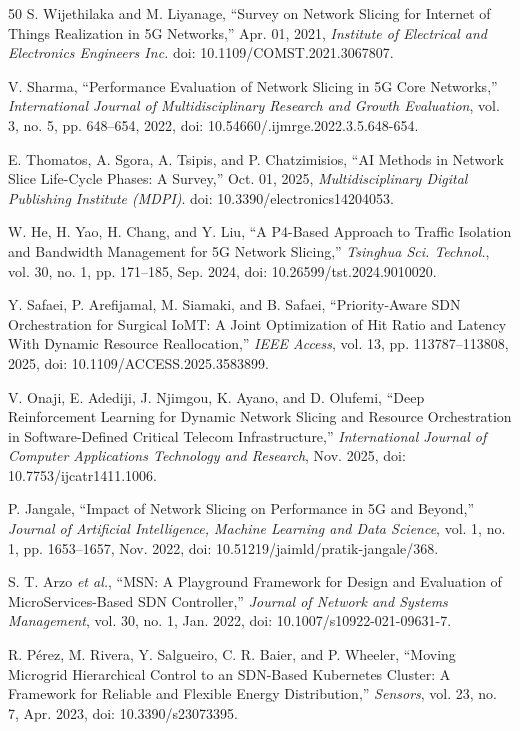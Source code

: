 \documentclass[conference]{IEEEtran}
\begin{document}
\begin{thebibliography}{50}
 S. Wijethilaka and M. Liyanage, ``Survey on Network Slicing for Internet of Things Realization in 5G Networks,'' Apr. 01, 2021, \emph{Institute of Electrical and Electronics Engineers Inc.} doi: 10.1109/COMST.2021.3067807.

 V. Sharma, ``Performance Evaluation of Network Slicing in 5G Core Networks,'' \emph{International Journal of Multidisciplinary Research and Growth Evaluation}, vol. 3, no. 5, pp. 648--654, 2022, doi: 10.54660/.ijmrge.2022.3.5.648-654.

 E. Thomatos, A. Sgora, A. Tsipis, and P. Chatzimisios, ``AI Methods in Network Slice Life-Cycle Phases: A Survey,'' Oct. 01, 2025, \emph{Multidisciplinary Digital Publishing Institute (MDPI)}. doi: 10.3390/electronics14204053.

 W. He, H. Yao, H. Chang, and Y. Liu, ``A P4-Based Approach to Traffic Isolation and Bandwidth Management for 5G Network Slicing,'' \emph{Tsinghua Sci. Technol.}, vol. 30, no. 1, pp. 171--185, Sep. 2024, doi: 10.26599/tst.2024.9010020.

 Y. Safaei, P. Arefijamal, M. Siamaki, and B. Safaei, ``Priority-Aware SDN Orchestration for Surgical IoMT: A Joint Optimization of Hit Ratio and Latency With Dynamic Resource Reallocation,'' \emph{IEEE Access}, vol. 13, pp. 113787--113808, 2025, doi: 10.1109/ACCESS.2025.3583899.

 V. Onaji, E. Adediji, J. Njimgou, K. Ayano, and D. Olufemi, ``Deep Reinforcement Learning for Dynamic Network Slicing and Resource Orchestration in Software-Defined Critical Telecom Infrastructure,'' \emph{International Journal of Computer Applications Technology and Research}, Nov. 2025, doi: 10.7753/ijcatr1411.1006.

 P. Jangale, ``Impact of Network Slicing on Performance in 5G and Beyond,'' \emph{Journal of Artificial Intelligence, Machine Learning and Data Science}, vol. 1, no. 1, pp. 1653--1657, Nov. 2022, doi: 10.51219/jaimld/pratik-jangale/368.

 S. T. Arzo \emph{et al.}, ``MSN: A Playground Framework for Design and Evaluation of MicroServices-Based SDN Controller,'' \emph{Journal of Network and Systems Management}, vol. 30, no. 1, Jan. 2022, doi: 10.1007/s10922-021-09631-7.

 R. Pérez, M. Rivera, Y. Salgueiro, C. R. Baier, and P. Wheeler, ``Moving Microgrid Hierarchical Control to an SDN-Based Kubernetes Cluster: A Framework for Reliable and Flexible Energy Distribution,'' \emph{Sensors}, vol. 23, no. 7, Apr. 2023, doi: 10.3390/s23073395.


\end{thebibliography}
\end{document}
